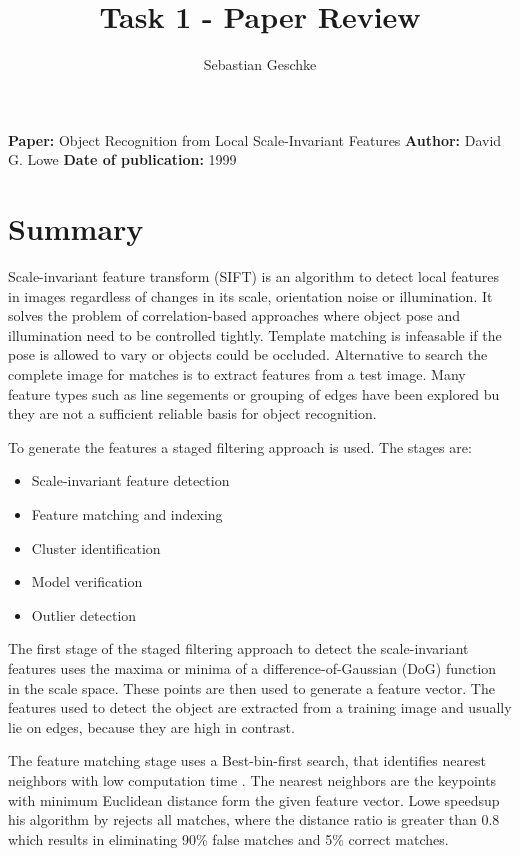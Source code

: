 \documentclass[11pt, a4paper]{article} %
\title{Task 1 - Paper Review}
\author{Sebastian Geschke}
\begin{document}
\maketitle

\noindent \textbf{Paper:} Object Recognition from Local Scale-Invariant Features \newline
\textbf{Author:} David G. Lowe \newline
\textbf{Date of publication:} 1999 
\section{Summary}
Scale-invariant feature transform (SIFT) is an algorithm to detect local features in images regardless of changes in its scale, orientation noise or illumination. It solves the problem of correlation-based approaches where object pose and illumination need to be controlled tightly. Template matching is infeasable if the pose is allowed to vary or objects could be occluded.
Alternative to search the complete image for matches is to extract features from a test image. Many feature types such as line segements or grouping of edges have been explored bu they are not a sufficient reliable basis for object recognition. 

To generate the features a staged filtering approach is used. The stages are:
\begin{itemize}
	\item Scale-invariant feature detection
	\item Feature matching and indexing
	\item Cluster identification
	\item Model verification
	\item Outlier detection
\end{itemize}
The first stage of the staged filtering approach to detect the scale-invariant features uses the maxima or minima of a difference-of-Gaussian (DoG) function in the scale space. These points are then used to generate a feature vector. 
The features used to detect the object are extracted from a training image and usually lie on edges, because they are high in contrast.

The feature matching stage uses a Best-bin-first search, that identifies nearest neighbors with low computation time \citep{Beis:1997}. The nearest neighbors are the keypoints with minimum Euclidean distance form the given feature vector. Lowe speedsup his algorithm by rejects all matches, where the distance ratio is greater than 0.8 which results in eliminating 90\% false matches and 5\% correct matches.
\end{document}

